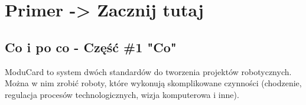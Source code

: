 \documentclass[b5paper, 10pt, twoside]{book}
\newcommand{\mcsbox}[2][Note]{%
  \vspace{6pt}%
  \noindent
  \begin{tikzpicture}
    \node[inner sep=7pt, text width=\dimexpr\linewidth-14pt] (txt)
      {\footnotesize\rmfamily\textbf{#1:} #2};
    \draw[hand, line width=1pt, inkBlack]
      (txt.north west) rectangle (txt.south east);
  \end{tikzpicture}%
  \vspace{4pt}%
}
\begin{document}







\chapter{Primer -> Zacznij tutaj} \label{Primer}
\section{Co i po co - Część \#1 "Co"}
ModuCard to system dwóch standardów do tworzenia projektów robotycznych. Można w nim zrobić roboty, które wykonują skomplikowane czynności (chodzenie, regulacja procesów technologicznych, wizja komputerowa i inne).
\end{document}
